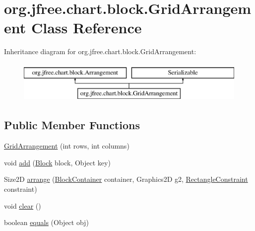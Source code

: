 \hypertarget{classorg_1_1jfree_1_1chart_1_1block_1_1_grid_arrangement}{}\section{org.\+jfree.\+chart.\+block.\+Grid\+Arrangement Class Reference}
\label{classorg_1_1jfree_1_1chart_1_1block_1_1_grid_arrangement}
Inheritance diagram for org.\+jfree.\+chart.\+block.\+Grid\+Arrangement\+:\begin{figure}[H]
\begin{center}
\leavevmode
\includegraphics[height=2.000000cm]{classorg_1_1jfree_1_1chart_1_1block_1_1_grid_arrangement}
\end{center}
\end{figure}
\subsection*{Public Member Functions}
\begin{DoxyCompactItemize}
\item 
\mbox{\hyperlink{classorg_1_1jfree_1_1chart_1_1block_1_1_grid_arrangement_ad9871f51d97c209ac3cc962ea971c2c8}{Grid\+Arrangement}} (int rows, int columns)
\item 
void \mbox{\hyperlink{classorg_1_1jfree_1_1chart_1_1block_1_1_grid_arrangement_a5ca7b468aa027c0d09752ee8fa9c33af}{add}} (\mbox{\hyperlink{interfaceorg_1_1jfree_1_1chart_1_1block_1_1_block}{Block}} block, Object key)
\item 
Size2D \mbox{\hyperlink{classorg_1_1jfree_1_1chart_1_1block_1_1_grid_arrangement_a5a9f29d29cb7fc231fc9b3205232b767}{arrange}} (\mbox{\hyperlink{classorg_1_1jfree_1_1chart_1_1block_1_1_block_container}{Block\+Container}} container, Graphics2D g2, \mbox{\hyperlink{classorg_1_1jfree_1_1chart_1_1block_1_1_rectangle_constraint}{Rectangle\+Constraint}} constraint)
\item 
void \mbox{\hyperlink{classorg_1_1jfree_1_1chart_1_1block_1_1_grid_arrangement_a4816d3d71a8538bb4206f57b39d88f3e}{clear}} ()
\item 
boolean \mbox{\hyperlink{classorg_1_1jfree_1_1chart_1_1block_1_1_grid_arrangement_ae8bbb7f3822468c8081da1b20e5bd123}{equals}} (Object obj)
\end{DoxyCompactItemize}
